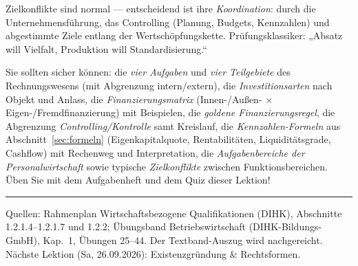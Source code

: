 \documentclass[11pt, a4paper]{article}
\begin{document}
\begin{merksatz}
Zielkonflikte sind normal --- entscheidend ist ihre \emph{Koordination}: durch die
Unternehmensführung, das Controlling (Planung, Budgets, Kennzahlen) und abgestimmte
Ziele entlang der Wertschöpfungskette. Prüfungsklassiker: „Absatz will Vielfalt,
Produktion will Standardisierung.``
\end{merksatz}

\begin{merksatz}[title={\bfseries Wichtig für die Prüfungsvorbereitung}]
Sie sollten sicher können: die \emph{vier Aufgaben} und \emph{vier Teilgebiete} des
Rechnungswesens (mit Abgrenzung intern/extern), die \emph{Investitionsarten} nach Objekt
und Anlass, die \emph{Finanzierungsmatrix} (Innen-/Außen- $\times$ Eigen-/Fremdfinanzierung)
mit Beispielen, die \emph{goldene Finanzierungsregel}, die Abgrenzung
\emph{Controlling/Kontrolle} samt Kreislauf, die \emph{Kennzahlen-Formeln} aus
Abschnitt~\ref{sec:formeln} (Eigenkapitalquote, Rentabilitäten, Liquiditätsgrade,
Cashflow) mit Rechenweg und Interpretation, die \emph{Aufgabenbereiche der
Personalwirtschaft} sowie typische \emph{Zielkonflikte} zwischen Funktionsbereichen.
Üben Sie mit dem Aufgabenheft und dem Quiz dieser Lektion!
\end{merksatz}

\vspace{1em}
\hrule
\vspace{0.8em}
\noindent\textsf{\small Quellen: Rahmenplan Wirtschaftsbezogene Qualifikationen (DIHK),
Abschnitte 1.2.1.4--1.2.1.7 und 1.2.2; Übungsband Betriebswirtschaft (DIHK-Bildungs-GmbH),
Kap.~1, Übungen 25--44. Der Textband-Auszug wird nachgereicht. Nächste Lektion
(Sa, 26.09.2026): Existenzgründung \& Rechtsformen.}
\end{document}
